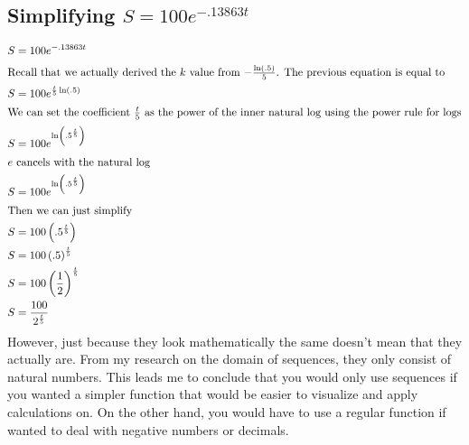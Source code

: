 \documentclass[12pt]{article}
\begin{document}
\subsection{Simplifying \texorpdfstring{$S=100e^{-.13863t}$}{Lg}}
\begin{align}
  S & =100e^{-.13863t}                           \\
  \intertext{Recall that we actually derived the $k$ value from $-\frac{\ln\left(.5\right)}{5}$. The previous equation is equal to}
  S & =100e^{\frac{t}{5}\ln\left(.5\right)}      \\
  \intertext{We can set the coefficient $\frac{t}{5}$ as the power of the inner natural log using the power rule for logs}
  S & =100e^{\ln\left(.5^{\frac{t}{5}}\right)}   \\
  \intertext{$e$ cancels with the natural log}
  S & =100e^{\ln\left(.5^{\frac{t}{5}}\right)}   \\
  \intertext{Then we can just simplify}
  S & =100\left(.5^{\frac{t}{5}}\right)          \\
  S & =100\left(.5\right)^{\frac{t}{5}}          \\
  S & =100\left(\frac{1}{2}\right)^{\frac{t}{5}} \\
  S & =\frac{100}{2^{\frac{t}{5}}}
\end{align}
However, just because they look mathematically the same doesn't mean that they actually are. From my research on the domain of sequences, they only consist of natural numbers. This leads me to conclude that you would only use sequences if you wanted a simpler function that would be easier to visualize and apply calculations on. On the other hand, you would have to use a regular function if wanted to deal with negative numbers or decimals.
\end{document}
